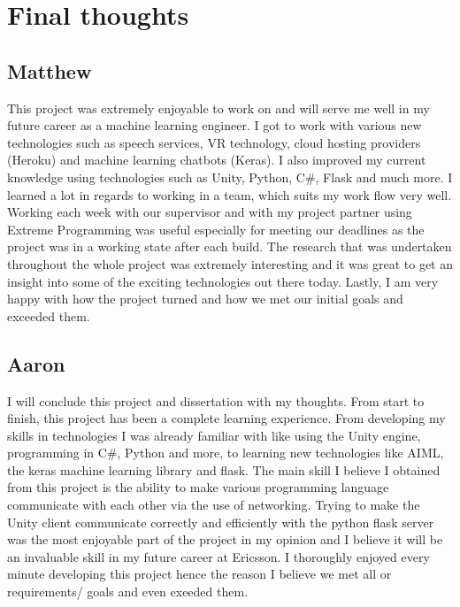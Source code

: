 \section{Final thoughts}
\subsection{Matthew}
This project was extremely enjoyable to work on and will serve me well in my future career as a machine learning engineer. I got to work with various new technologies such as speech services, VR technology, cloud hosting providers (Heroku) and machine learning chatbots (Keras). I also improved my current knowledge using technologies such as Unity, Python, C\#, Flask and much more. I learned a lot in regards to working in a team, which suits my work flow very well. Working each week with our supervisor and with my project partner using Extreme Programming was useful especially for meeting our deadlines as the project was in a working state after each build. The research that was undertaken throughout the whole project was extremely interesting and it was great to get an insight into some of the exciting technologies out there today. Lastly, I am very happy with how the project turned and how we met our initial goals and exceeded them.

\subsection{Aaron}
I will conclude this project and dissertation with my thoughts. From start to finish, this project has been a complete learning experience. From developing my skills in technologies I was already familiar with like using the Unity engine, programming in C\#, Python and more, to learning new technologies like AIML, the keras machine learning library and flask. The main skill I believe I obtained from this project is the ability to make various programming language communicate with each other via the use of networking. Trying to make the Unity client communicate correctly and efficiently with the python flask server was the most enjoyable part of the project in my opinion and I believe it will be an invaluable skill in my future career at Ericsson. I thoroughly enjoyed every minute developing this project hence the reason I believe we met all or requirements/ goals and even exeeded them.